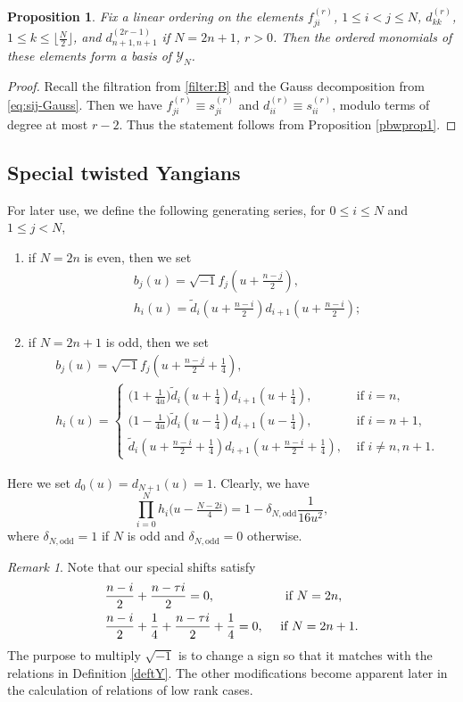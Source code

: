 \documentclass[11pt,reqno]{amsart}
\numberwithin{equation}{section}
\newtheorem{prop}[thm]{Proposition}
\theoremstyle{definition}
\theoremstyle{remark}
\newtheorem{rem}[thm]{Remark}
\newcommand{\beq}{\begin{equation}}
\newcommand{\eeq}{\end{equation}}
\newcommand{\tl}{\tilde}
\newcommand{\lle}{\leqslant}
\newcommand{\Y}{{\mathscr{Y}}}
\begin{document}
\begin{prop}
Fix a linear ordering on the elements $f_{ji}^{(r)}$, $1\lle i<j\lle N$, $d_{kk}^{(r)}$, $1\lle k \lle \lfloor \tfrac{N}{2}\rfloor$, and $d_{n+1,n+1}^{(2r-1)}$ if $N=2n+1$, $r>0$. Then the ordered monomials of these elements form a basis of $\Y_N$.
\end{prop}
\begin{proof}
Recall the filtration from \eqref{filter:B} and the Gauss decomposition from \eqref{eq:sij-Gauss}. Then we have $f_{ji}^{(r)}\equiv s_{ji}^{(r)}$ and $d_{ii}^{(r)}\equiv s_{ii}^{(r)}$, modulo terms of degree at most $r-2$. Thus the statement follows from Proposition \ref{pbwprop1}.
\end{proof}

\subsection{Special twisted Yangians}\label{sec:hb}
For later use, we define the following generating series, for $0\lle i\lle N$ and $1\lle j< N$,
\begin{enumerate}
    \item if $N=2n$ is even, then we set
\begin{align}
& b_j(u)= \sqrt{-1}f_j(u+\tfrac{n-j}{2}),\label{beven}\\
& h_i(u)=\tl d_{i}(u+\tfrac{n-i}{2})d_{i+1}(u+\tfrac{n-i}{2})\label{heven};
\end{align}
\item if $N=2n+1$ is odd, then we set
\begin{align}
&b_j(u)= \sqrt{-1}f_j(u+\tfrac{n-j}{2}+\tfrac{1}{4}),\label{bodd}\\
&h_i(u)=
\begin{cases}
\big(1+\tfrac{1}{4u}\big)\tl d_{i}(u+\tfrac{1}{4})d_{i+1}(u+\tfrac{1}{4}), &\text{ if } i=n,\\
\big(1-\tfrac{1}{4u}\big)\tl d_{i}(u-\tfrac{1}{4})d_{i+1}(u-\tfrac{1}{4}), &\text{ if } i=n+1,\\
\tl d_{i}(u+\tfrac{n-i}{2}+\tfrac{1}{4})d_{i+1}(u+\tfrac{n-i}{2}+\tfrac{1}{4}), &\text{ if } i\ne n,n+1.
\end{cases}\label{hodd}
\end{align}
\end{enumerate}
Here we set $d_0(u)=d_{N+1}(u)=1$. Clearly, we have
\beq\label{prod}
\prod_{i=0}^N h_i\big(u-\tfrac{N-2i}{4}\big)=1-\delta_{N,\mathrm{odd}}\frac{1}{16u^2},
\eeq
where $\delta_{N,\mathrm{odd}}=1$ if $N$ is odd and $\delta_{N,\mathrm{odd}}=0$ otherwise.
\begin{rem}
Note that our special shifts satisfy
\begin{align*}
& \frac{n-i}{2}+\frac{n-\tau i}{2}=0,\hskip1.87cm\text{ if }N=2n,\\
& \frac{n-i}{2}+\frac{1}{4}+\frac{n-\tau i}{2}+\frac{1}{4}=0,\quad \text{ if }N=2n+1.
\end{align*}
The purpose to multiply $\sqrt{-1}$ is to change a sign so that it matches with the relations in Definition \ref{deftY}. The other modifications become apparent later in the calculation of relations of low rank cases.
\end{rem}
\end{document}
